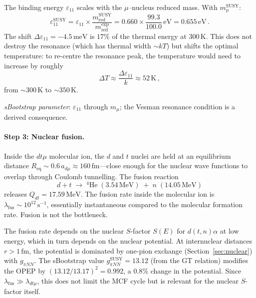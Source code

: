 \documentclass[12pt,a4paper]{article}
\newcommand{\MeV}{\,\text{MeV}}
\newcommand{\eV}{\,\text{eV}}
\begin{document}
The binding energy $\varepsilon_{11}$ scales with the $\mu$--nucleus
reduced mass.  With $m_\mu^{\text{SUSY}}$:
\begin{equation}
  \varepsilon_{11}^{\text{SUSY}}
  = \varepsilon_{11} \times
    \frac{m_{\text{red}}^{\text{SUSY}}}{m_{\text{red}}^{\text{exp}}}
  = 0.660 \times \frac{99.3}{100.0}\eV
  = 0.655\eV\,.
\end{equation}
The shift $\Delta\varepsilon_{11} = -4.5\,\text{meV}$ is $17\%$
of the thermal energy at $300\,\text{K}$.  This does not destroy
the resonance (which has thermal width $\sim kT$) but shifts
the optimal temperature: to re-centre the resonance peak,
the temperature would need to increase by roughly
\begin{equation}
  \Delta T \approx
  \frac{\Delta\varepsilon_{11}}{k} \approx 52\,\text{K}\,,
\end{equation}
from $\sim 300\,\text{K}$ to $\sim 350\,\text{K}$.

\emph{sBootstrap parameter}: $\varepsilon_{11}$ through $m_\mu$;
the Vesman resonance condition is a derived consequence.

\paragraph{Step 3: Nuclear fusion.}
Inside the $dt\mu$ molecular ion, the $d$ and $t$ nuclei are held at
an equilibrium distance $R_{\text{eq}} \sim 0.6\,a_{d\mu}
\approx 160\,\text{fm}$---close enough for the nuclear wave functions
to overlap through Coulomb tunnelling.  The fusion reaction
\begin{equation}
  d + t \;\to\; {}^4\text{He}\;(3.54\MeV)
  \;+\; n\;(14.05\MeV)
\end{equation}
releases $Q_{dt} = 17.59\MeV$.  The fusion rate inside
the molecular ion is $\lambda_{\text{fus}} \sim 10^{12}\,\text{s}^{-1}$,
essentially instantaneous compared to the molecular formation rate.
Fusion is not the bottleneck.

The fusion rate depends on the nuclear $S$-factor $S(E)$ for
$d(t,n)\alpha$ at low energy, which in turn depends on the nuclear
potential.  At internuclear distances $r > 1\,\text{fm}$, the
potential is dominated by one-pion exchange (Section~\ref{sec:nuclear})
with $g_{\pi NN}$.  The sBootstrap value $g_{\pi NN}^{\text{SUSY}}
= 13.12$ (from the GT relation) modifies the OPEP by $(13.12/13.17)^2
= 0.992$, a $0.8\%$ change in the potential.  Since
$\lambda_{\text{fus}} \gg \lambda_{dt\mu}$, this does not limit the
MCF cycle but is relevant for the nuclear $S$-factor itself.
\end{document}
